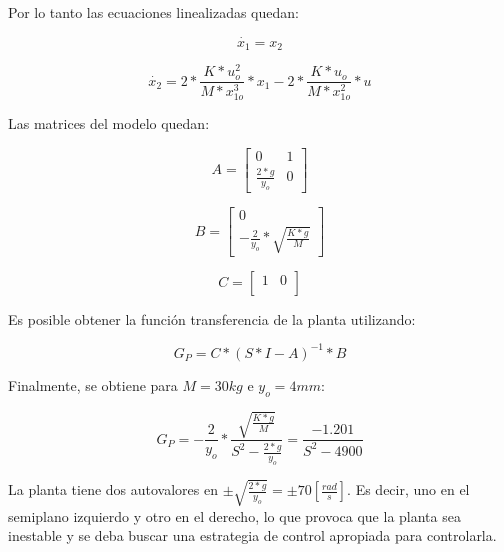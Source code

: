 \noindent Por lo tanto las ecuaciones linealizadas quedan:

\begin{equation}
	\dot{x_{1}}=x_{2}
\end{equation}

\begin{equation}
	\dot{x_{2}}=2*\frac{K*u_{o}^{2}}{M*x_{1o}^{3}}*x_{1}-2*\frac{K*u_{o}}{M*x_{1o}^{2}}*u
\end{equation}

\noindent Las matrices del modelo quedan:

\begin{equation}
	A=\begin{bmatrix}
		0 & 1\\
		\frac{2*g}{y_{o}} & 0
	\end{bmatrix}
\end{equation}

\begin{equation}
	B=\begin{bmatrix}
		0\\
		-\frac{2}{y_{o}}*\sqrt{\frac{K*g}{M}}
	\end{bmatrix}
\end{equation}

\begin{equation}
	C=\begin{bmatrix}
		1 & 0\\
	\end{bmatrix}
\end{equation}

\noindent Es posible obtener la función transferencia de la planta utilizando:

\begin{equation}\label{eq_transferencia_planta}
	G_{P}=C*(S*I-A)^{-1}*B
\end{equation}

\noindent Finalmente, se obtiene para $M=30kg$ e $y_{o}=4mm$:

\begin{equation}
	G_{P}=-\frac{2}{y_{o}}*\frac{\sqrt{\frac{K*g}{M}}}{S^2-\frac{2*g}{y_{o}}}=\frac{-1.201}{S^{2}-4900}
\end{equation}

\noindent La planta tiene dos autovalores en $\pm\sqrt{\frac{2*g}{y_{o}}}=\pm70[\frac{rad}{s}]$. Es decir, uno en el semiplano izquierdo y otro en el derecho, lo que provoca que la planta sea inestable y se deba buscar una estrategia de control apropiada para controlarla.

